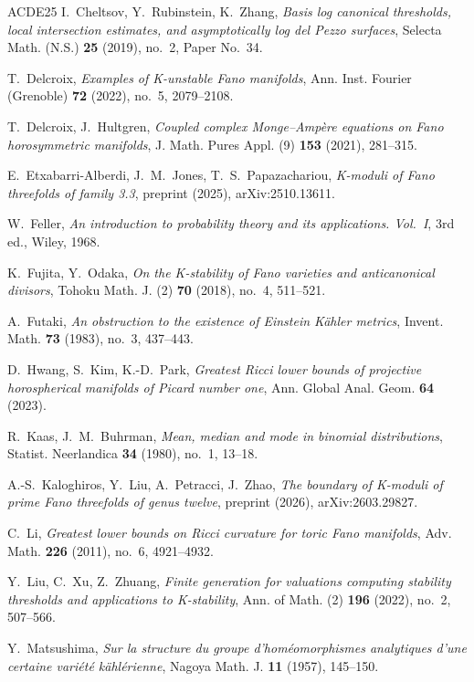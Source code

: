 \documentclass[11pt]{amsart}
\theoremstyle{definition}
\theoremstyle{remark}
\begin{document}
\begin{thebibliography}{ACDE25}
I.~Cheltsov, Y.~Rubinstein, K.~Zhang,
\emph{Basis log canonical thresholds, local intersection estimates,
and asymptotically log del Pezzo surfaces},
Selecta Math. (N.S.) \textbf{25} (2019), no.~2, Paper No.~34.

T.~Delcroix,
\emph{Examples of K-unstable Fano manifolds},
Ann. Inst. Fourier (Grenoble) \textbf{72} (2022), no.~5, 2079--2108.

T.~Delcroix, J.~Hultgren,
\emph{Coupled complex Monge--Amp\`ere equations on Fano horosymmetric
manifolds},
J. Math. Pures Appl. (9) \textbf{153} (2021), 281--315.

E.~Etxabarri-Alberdi, J.~M.~Jones, T.~S.~Papazachariou,
\emph{K-moduli of Fano threefolds of family 3.3},
preprint (2025), arXiv:2510.13611.

W.~Feller,
\emph{An introduction to probability theory and its applications.
Vol.~I}, 3rd ed., Wiley, 1968.

K.~Fujita, Y.~Odaka,
\emph{On the K-stability of Fano varieties and anticanonical divisors},
Tohoku Math. J. (2) \textbf{70} (2018), no.~4, 511--521.

A.~Futaki,
\emph{An obstruction to the existence of Einstein K\"ahler metrics},
Invent. Math. \textbf{73} (1983), no.~3, 437--443.

D.~Hwang, S.~Kim, K.-D.~Park,
\emph{Greatest Ricci lower bounds of projective horospherical
manifolds of Picard number one},
Ann. Global Anal. Geom. \textbf{64} (2023).

R.~Kaas, J.~M.~Buhrman,
\emph{Mean, median and mode in binomial distributions},
Statist. Neerlandica \textbf{34} (1980), no.~1, 13--18.

A.-S.~Kaloghiros, Y.~Liu, A.~Petracci, J.~Zhao,
\emph{The boundary of K-moduli of prime Fano threefolds of genus
twelve}, preprint (2026), arXiv:2603.29827.

C.~Li,
\emph{Greatest lower bounds on Ricci curvature for toric Fano
manifolds},
Adv. Math. \textbf{226} (2011), no.~6, 4921--4932.

Y.~Liu, C.~Xu, Z.~Zhuang,
\emph{Finite generation for valuations computing stability thresholds
and applications to K-stability},
Ann. of Math. (2) \textbf{196} (2022), no.~2, 507--566.

Y.~Matsushima,
\emph{Sur la structure du groupe d'hom\'eomorphismes analytiques d'une
certaine vari\'et\'e k\"ahl\'erienne},
Nagoya Math. J. \textbf{11} (1957), 145--150.


\end{thebibliography}
\end{document}
